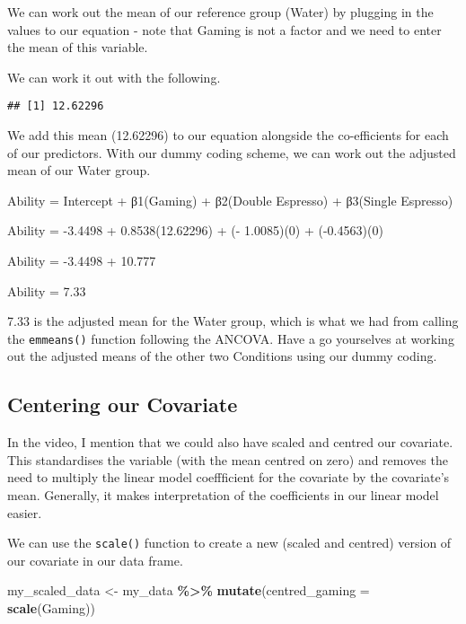 \documentclass[
]{book}
\newenvironment{Shaded}{\begin{snugshade}}{\end{snugshade}}
\newcommand{\AttributeTok}[1]{\textcolor[rgb]{0.13,0.29,0.53}{#1}}
\newcommand{\FunctionTok}[1]{\textcolor[rgb]{0.13,0.29,0.53}{\textbf{#1}}}
\newcommand{\NormalTok}[1]{#1}
\newcommand{\OtherTok}[1]{\textcolor[rgb]{0.56,0.35,0.01}{#1}}
\newcommand{\SpecialCharTok}[1]{\textcolor[rgb]{0.81,0.36,0.00}{\textbf{#1}}}
\begin{document}
We can work out the mean of our reference group (Water) by plugging in the values to our equation - note that Gaming is not a factor and we need to enter the mean of this variable.

We can work it out with the following.

\begin{Shaded}
\end{Shaded}

\begin{verbatim}
## [1] 12.62296
\end{verbatim}

We add this mean (12.62296) to our equation alongside the co-efficients for each of our predictors. With our dummy coding scheme, we can work out the adjusted mean of our Water group.

Ability = Intercept + β1(Gaming) + β2(Double Espresso) + β3(Single Espresso)

Ability = -3.4498 + 0.8538(12.62296) + (- 1.0085)(0) + (-0.4563)(0)

Ability = -3.4498 + 10.777

Ability = 7.33

7.33 is the adjusted mean for the Water group, which is what we had from calling the \texttt{emmeans()} function following the ANCOVA. Have a go yourselves at working out the adjusted means of the other two Conditions using our dummy coding.

\hypertarget{centering-our-covariate}{%
\subsection{Centering our Covariate}\label{centering-our-covariate}}

In the video, I mention that we could also have scaled and centred our covariate. This standardises the variable (with the mean centred on zero) and removes the need to multiply the linear model coeffficient for the covariate by the covariate's mean. Generally, it makes interpretation of the coefficients in our linear model easier.

We can use the \texttt{scale()} function to create a new (scaled and centred) version of our covariate in our data frame.

\begin{Shaded}
\begin{Highlighting}[]
\NormalTok{my\_scaled\_data }\OtherTok{\textless{}{-}}\NormalTok{ my\_data }\SpecialCharTok{\%\textgreater{}\%}
  \FunctionTok{mutate}\NormalTok{(}\AttributeTok{centred\_gaming =} \FunctionTok{scale}\NormalTok{(Gaming))}
\end{Highlighting}
\end{Shaded}
\end{document}
